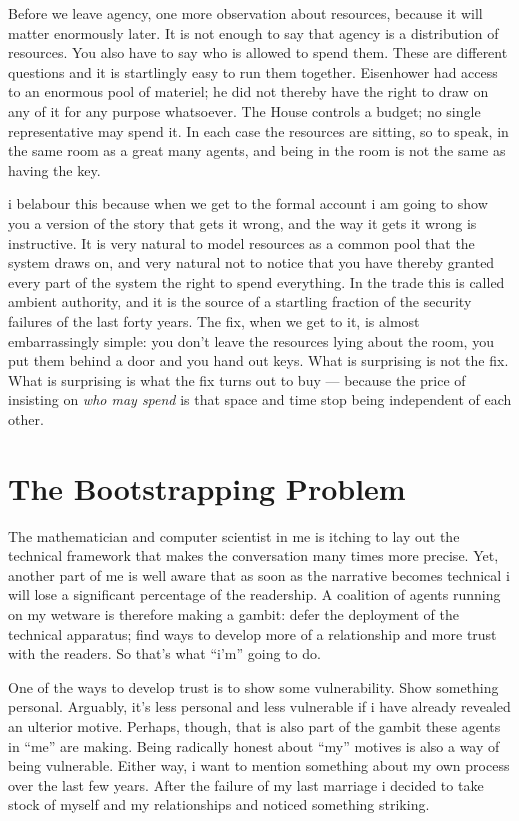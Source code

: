 Before we leave agency, one more observation about resources, because it will matter enormously later. It is not enough to say that agency is a distribution of resources. You also have to say who is allowed to spend them. These are different questions and it is startlingly easy to run them together. Eisenhower had access to an enormous pool of materiel; he did not thereby have the right to draw on any of it for any purpose whatsoever. The House controls a budget; no single representative may spend it. In each case the resources are sitting, so to speak, in the same room as a great many agents, and being in the room is not the same as having the key.

i belabour this because when we get to the formal account i am going to show you a version of the story that gets it wrong, and the way it gets it wrong is instructive. It is very natural to model resources as a common pool that the system draws on, and very natural not to notice that you have thereby granted every part of the system the right to spend everything. In the trade this is called ambient authority, and it is the source of a startling fraction of the security failures of the last forty years. The fix, when we get to it, is almost embarrassingly simple: you don't leave the resources lying about the room, you put them behind a door and you hand out keys. What is surprising is not the fix. What is surprising is what the fix turns out to buy --- because the price of insisting on \emph{who may spend} is that space and time stop being independent of each other.

\section{The Bootstrapping Problem}
\label{sec:pledge-iii}

The mathematician and computer scientist in me is itching to lay out the technical framework that makes the conversation many times more precise. Yet, another part of me is well aware that as soon as the narrative becomes technical i will lose a significant percentage of the readership. A coalition of agents running on my wetware is therefore making a gambit: defer the deployment of the technical apparatus; find ways to develop more of a relationship and more trust with the readers. So that's what ``i'm'' going to do.

One of the ways to develop trust is to show some vulnerability. Show something personal. Arguably, it's less personal and less vulnerable if i have already revealed an ulterior motive. Perhaps, though, that is also part of the gambit these agents in ``me'' are making. Being radically honest about ``my'' motives is also a way of being vulnerable. Either way, i want to mention something about my own process over the last few years. After the failure of my last marriage i decided to take stock of myself and my relationships and noticed something striking. 

